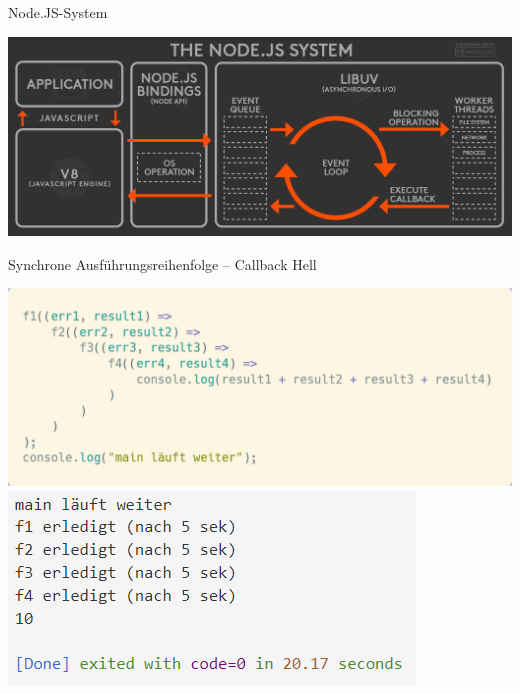 \documentclass[t,handout]{beamer}
\begin{document}
\begin{frame}{Node.JS-System}
  \begin{center}
    \includegraphics[scale=.25]{fig/nodejs-system1.jpg}
  \end{center}
\end{frame}

\begin{frame}{Synchrone Ausführungsreihenfolge -- Callback Hell}
  \begin{center}
    \includegraphics[scale=.28]{fig/async5.png}\\[.1cm]
    \includegraphics[scale=.6]{fig/async6.png}
  \end{center}
\end{frame}
\end{document}
